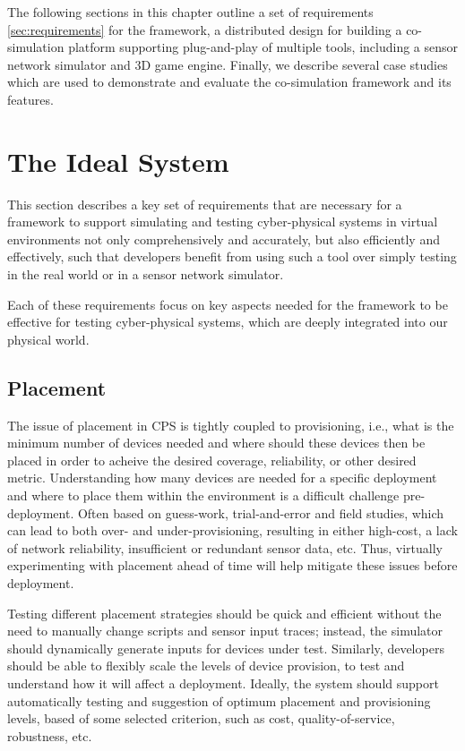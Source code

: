 The following sections in this chapter outline a set of requirements \ref{sec:requirements} for the framework, a distributed design for building a co-simulation platform supporting plug-and-play of multiple tools, including a sensor network simulator and 3D game engine. Finally, we describe several case studies which are used to demonstrate and evaluate the co-simulation framework and its features.  


\section{The Ideal System}
\label{sec:Requirements}
This section describes a key set of requirements that are necessary for a framework to support simulating and testing cyber-physical systems in virtual environments not only comprehensively and accurately, but also efficiently and effectively, such that developers benefit from using such a tool over simply testing in the real world or in a sensor network simulator.

Each of these requirements focus on key aspects needed for the framework to be effective for testing cyber-physical systems, which are deeply integrated into our physical world.

\subsection{Placement}
\label{sub:requirements_3D design and placement}
The issue of placement in CPS is tightly coupled to provisioning, i.e., what is the minimum number of devices needed and where should these devices then be placed in order to acheive the desired coverage, reliability, or other desired metric. 
Understanding how many devices are needed for a specific deployment and where to place them within the environment is a difficult challenge pre-deployment. Often based on guess-work, trial-and-error and field studies, which can lead to both over- and under-provisioning, resulting in either high-cost, a lack of network reliability, insufficient or redundant sensor data, etc. 
Thus, virtually experimenting with placement ahead of time will help mitigate these issues before deployment. 

Testing different placement strategies should be quick and efficient without the need to manually change scripts and sensor input traces; instead, the simulator should dynamically generate inputs for devices under test. Similarly, developers should be able to flexibly scale the levels of device provision, to test and understand how it will affect a deployment. Ideally, the system should support automatically testing and suggestion of optimum placement and provisioning levels, based of some selected criterion, such as cost, quality-of-service, robustness, etc.


